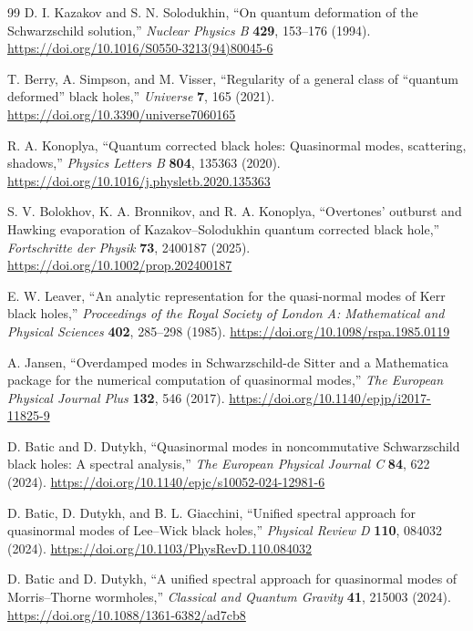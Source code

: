 ﻿\documentclass[12pt,a4paper]{article}
\begin{document}
\begin{thebibliography}{99}
D. I. Kazakov and S. N. Solodukhin,
``On quantum deformation of the Schwarzschild solution,''
\emph{Nuclear Physics B} \textbf{429}, 153--176 (1994).
\url{https://doi.org/10.1016/S0550-3213(94)80045-6}

T. Berry, A. Simpson, and M. Visser,
``Regularity of a general class of ``quantum deformed'' black holes,''
\emph{Universe} \textbf{7}, 165 (2021).
\url{https://doi.org/10.3390/universe7060165}

R. A. Konoplya,
``Quantum corrected black holes: Quasinormal modes, scattering, shadows,''
\emph{Physics Letters B} \textbf{804}, 135363 (2020).
\url{https://doi.org/10.1016/j.physletb.2020.135363}

S. V. Bolokhov, K. A. Bronnikov, and R. A. Konoplya,
``Overtones' outburst and Hawking evaporation of Kazakov--Solodukhin quantum corrected black hole,''
\emph{Fortschritte der Physik} \textbf{73}, 2400187 (2025).
\url{https://doi.org/10.1002/prop.202400187}

E. W. Leaver,
``An analytic representation for the quasi-normal modes of Kerr black holes,''
\emph{Proceedings of the Royal Society of London A: Mathematical and Physical Sciences} \textbf{402}, 285--298 (1985).
\url{https://doi.org/10.1098/rspa.1985.0119}

A. Jansen,
``Overdamped modes in Schwarzschild-de Sitter and a Mathematica package for the numerical computation of quasinormal modes,''
\emph{The European Physical Journal Plus} \textbf{132}, 546 (2017).
\url{https://doi.org/10.1140/epjp/i2017-11825-9}

D. Batic and D. Dutykh,
``Quasinormal modes in noncommutative Schwarzschild black holes: A spectral analysis,''
\emph{The European Physical Journal C} \textbf{84}, 622 (2024).
\url{https://doi.org/10.1140/epjc/s10052-024-12981-6}

D. Batic, D. Dutykh, and B. L. Giacchini,
``Unified spectral approach for quasinormal modes of Lee--Wick black holes,''
\emph{Physical Review D} \textbf{110}, 084032 (2024).
\url{https://doi.org/10.1103/PhysRevD.110.084032}

D. Batic and D. Dutykh,
``A unified spectral approach for quasinormal modes of Morris--Thorne wormholes,''
\emph{Classical and Quantum Gravity} \textbf{41}, 215003 (2024).
\url{https://doi.org/10.1088/1361-6382/ad7cb8}


\end{thebibliography}
\end{document}
